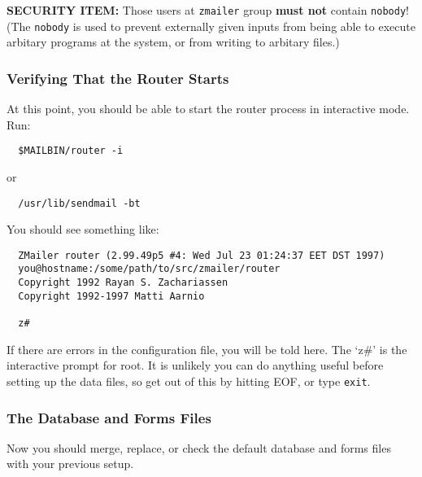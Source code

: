 {\bf SECURITY ITEM:} Those users at {\tt zmailer} group {\bf must not} contain {\tt nobody}!
(The {\tt nobody} is used to prevent externally given inputs from being
able to execute arbitary programs at the system, or from writing to
arbitary files.)




\subsubsection{Verifying That the Router Starts}

At this point, you should be able to start the router process in
interactive mode.  Run:
\begin{verbatim}
  $MAILBIN/router -i
\end{verbatim}

or
\begin{verbatim}
  /usr/lib/sendmail -bt
\end{verbatim}

You should see something like:
\begin{verbatim}
  ZMailer router (2.99.49p5 #4: Wed Jul 23 01:24:37 EET DST 1997)
  you@hostname:/some/path/to/src/zmailer/router
  Copyright 1992 Rayan S. Zachariassen
  Copyright 1992-1997 Matti Aarnio
  
  z#    
\end{verbatim}

If there are errors in the configuration file, you will be told here.
The `z\#' is the interactive prompt for root. It is unlikely you can do anything useful 
before setting up the data files, so get out of this by hitting EOF, or type {\tt exit}.




\subsubsection{The Database and Forms Files}

Now you should merge, replace, or check the default database and
forms files with your previous setup.

